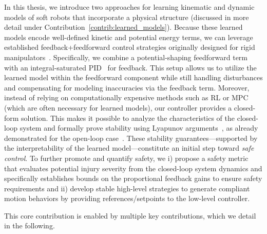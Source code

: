 In this thesis, we introduce two approaches for learning kinematic and dynamic models of soft robots that incorporate a physical structure (discussed in more detail under Contribution~\ref{contrib:learned_models}). Because these learned models encode well-defined kinetic and potential energy terms, we can leverage established feedback+feedforward control strategies originally designed for rigid manipulators~\citep{kelly1995tuning, kelly1996class, kelly1998global, sciavicco2012modelling}. Specifically, we combine a potential-shaping feedforward term~\citep{della2023model} with an integral-saturated PID~\citep{pustina2022p} for feedback. This setup allows us to utilize the learned model within the feedforward component while still handling disturbances and compensating for modeling inaccuracies via the feedback term.
% 
Moreover, instead of relying on computationally expensive methods such as \gls{RL} or \gls{MPC} (which are often necessary for learned models), our controller provides a closed-form solution. This makes it possible to analyze the characteristics of the closed-loop system and formally prove stability using Lyapunov arguments~\citep{khalil2002nonlinear}, as already demonstrated for the open-loop case~\citep{stolzle2024input}. These stability guarantees—supported by the interpretability of the learned model—constitute an initial step toward \emph{safe control}.
% 
To further promote and quantify safety, we i) propose a safety metric that evaluates potential injury severity from the closed-loop system dynamics and specifically establishes bounds on the proportional feedback gains to ensure safety requirements and ii) develop stable high-level strategies to generate compliant motion behaviors by providing references/setpoints to the low-level controller.

This core contribution is enabled by multiple key contributions, which we detail in the following.

